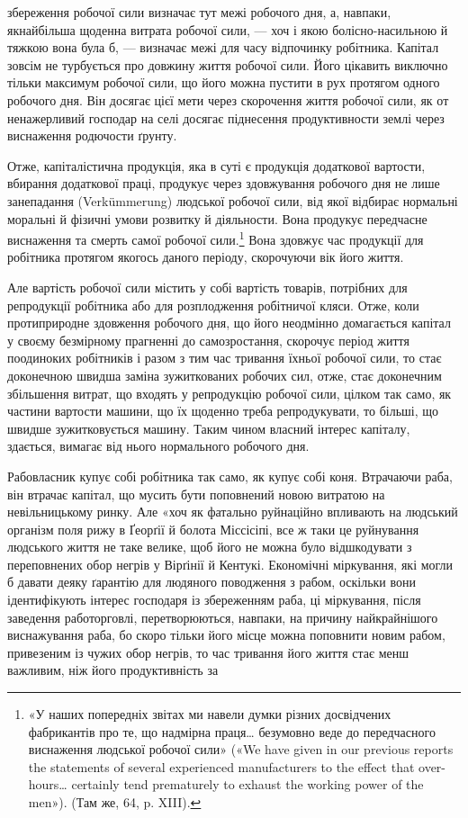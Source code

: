 \parcont{}  %
збереження робочої сили визначає тут межі робочого дня, а,
навпаки, якнайбільша щоденна витрата робочої сили, — хоч і
якою болісно-насильною й тяжкою вона була б, — визначає
межі для часу відпочинку робітника. Капітал зовсім не турбується
про довжину життя робочої сили. Його цікавить виключно тільки
максимум робочої сили, що його можна пустити в рух протягом
одного робочого дня. Він досягає цієї мети через скорочення життя
робочої сили, як от ненажерливий господар на селі досягає піднесення
продуктивности землі через виснаження родючости ґрунту.

Отже, капіталістична продукція, яка в суті є продукція додаткової
вартости, вбирання додаткової праці, продукує через
здовжування робочого дня не лише занепадання (Verkümmerung)
людської робочої сили, від якої відбирає нормальні моральні й
фізичні умови розвитку й діяльности. Вона продукує передчасне
виснаження та смерть самої робочої сили.\footnote{
«У наших попередніх звітах ми навели думки різних досвідчених
фабрикантів про те, що надмірна праця\dots{} безумовно веде до передчасного
виснаження людської робочої сили» («We have given in our previous
reports the statements of several experienced manufacturers to the effect
that over-hours\dots{} certainly tend prematurely to exhaust the working
power of the men»). (Там же, 64, p. XIII).
} Вона здовжує
час продукції для робітника протягом якогось даного періоду,
скорочуючи вік його життя.

Але вартість робочої сили містить у собі вартість товарів,
потрібних для репродукції робітника або для розплодження
робітничої кляси. Отже, коли протиприродне здовження робочого
дня, що його неодмінно домагається капітал у своєму безмірному
прагненні до самозростання, скорочує період життя поодиноких
робітників і разом з тим час тривання їхньої робочої сили, то
стає доконечною швидша заміна зужиткованих робочих сил, отже,
стає доконечним збільшення витрат, що входять у репродукцію
робочої сили, цілком так само, як частини вартости машини, що
їх щоденно треба репродукувати, то більші, що швидше зужитковується
машину. Таким чином власний інтерес капіталу, здається,
вимагає від нього нормального робочого дня.

Рабовласник купує собі робітника так само, як купує собі
коня. Втрачаючи раба, він втрачає капітал, що мусить бути поповнений
новою витратою на невільницькому ринку. Але «хоч
як фатально руйнаційно впливають на людський організм поля
рижу в Ґеорґії й болота Міссісіпі, все ж таки це руйнування людського
життя не таке велике, щоб його не можна було відшкодувати
з переповнених обор негрів у Вірґінії й Кентукі. Економічні
міркування, які могли б давати деяку ґарантію для людяного
поводження з рабом, оскільки вони ідентифікують інтерес господаря
із збереженням раба, ці міркування, після заведення работорговлі,
перетворюються, навпаки, на причину найкрайнішого
виснажування раба, бо скоро тільки його місце можна поповнити
новим рабом, привезеним із чужих обор негрів, то час тривання
його життя стає менш важливим, ніж його продуктивність за
\parbreak{}  %
